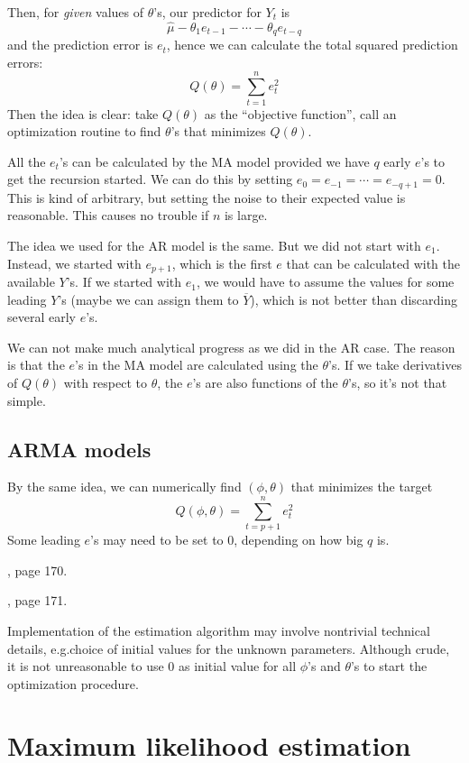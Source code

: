 \documentclass[12pt]{article}
\begin{document}
Then,
for \emph{given} values of $\theta$'s, our predictor for $Y_t$ is
\[
\hat{\mu} - \theta_1 e_{t-1} - \dotsb - \theta_q e_{t-q}
\]
and the prediction error is $e_t$,
hence we can calculate the total squared prediction errors:
\[
Q(\theta)
= \sum_{t=1}^n e_t^2
\]
Then the idea is clear: take $Q(\theta)$ as the ``objective function'',
call an optimization routine to find $\theta$'s that minimizes
$Q(\theta)$.

All the $e_t$'s can be calculated by the MA model provided we have $q$
early $e$'s to get the recursion started.
We can do this by setting
$e_{0} = e_{-1} = \dotsb = e_{-q+1} = 0$.
This is kind of arbitrary,
but setting the noise to their expected value is reasonable.
This causes no trouble if $n$ is large.

\alert
The idea we used for the AR model is the same.
But we did not start with $e_1$.
Instead, we started with $e_{p+1}$, which is the first $e$ that can be
calculated with the available $Y$'s.
If we started with $e_1$, we would have to assume the values for some
leading $Y$'s (maybe we can assign them to $\overline{Y}$),
which is not better than discarding several early $e$'s.

\alert
We can not make much analytical progress as we did in the AR case.
The reason is that the $e$'s in the MA model are calculated using the
$\theta$'s.
If we take derivatives of $Q(\theta)$ with respect to $\theta$,
the $e$'s are also functions of the $\theta$'s,
so it's not that simple.

\subsection{ARMA models}

By the same idea, we can numerically find
$(\phi, \theta)$ that minimizes the target
\[
Q(\phi, \theta)
= \sum_{t=p+1}^n e_t^2
\]
Some leading $e$'s may need to be set to 0,
depending on how big $q$ is.

, page 170.

, page 171.

\alert
Implementation of the estimation algorithm
may involve nontrivial technical details,
e.g.\@ choice of initial values for the unknown parameters.
Although crude, it is not unreasonable to use 0
as initial value for all $\phi$'s and $\theta$'s
to start the optimization procedure.

\section{Maximum likelihood estimation}
\end{document}
